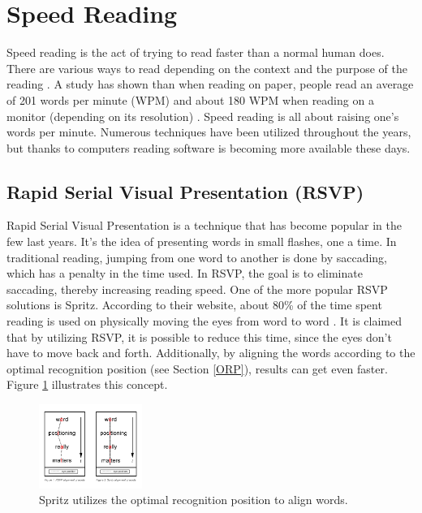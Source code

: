 \section{Speed Reading}
Speed reading is the act of trying to read faster than a normal human does. There are various ways to read depending on the context and the purpose of the reading \cite{differentWaysOfReading}. A study has shown than when reading on paper, people read an average of 201 words per minute (WPM) and about 180 WPM when reading on a monitor (depending on its resolution) \cite{ziefle_effects_1998}. Speed reading is all about raising one's words per minute. Numerous techniques have been utilized throughout the years, but thanks to computers reading software is becoming more available these days.


\subsection{Rapid Serial Visual Presentation (RSVP)}
Rapid Serial Visual Presentation is a technique that has become popular in the few last years. It's the idea of presenting words in small flashes, one a time. In traditional reading, jumping from one word to another is done by saccading, which has a penalty in the time used. In RSVP, the goal is to eliminate saccading, thereby increasing reading speed. One of the more popular RSVP solutions is Spritz. According to their website, about 80\% of the time spent reading is used on physically moving the eyes from word to word \cite{spritz}.	It is claimed that by utilizing RSVP, it is possible to reduce this time, since the eyes don't have to move back and forth. Additionally, by aligning the words according to the optimal recognition position (see Section \ref{ORP}), results can get even faster. Figure \ref{fig:spritz_orp} illustrates this concept.

\begin{figure}[htbp]
\centering
\includegraphics[width=0.3\textwidth]{Pics/opr_spritz}
\caption{Spritz utilizes the optimal recognition position to align words.}
\label{fig:spritz_orp}
\end{figure}


